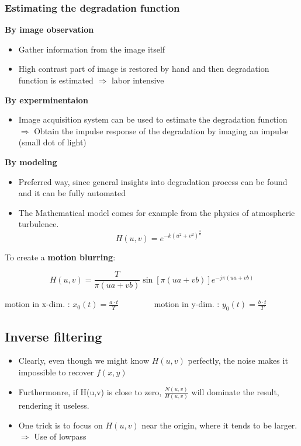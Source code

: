 \subsubsection{Estimating the degradation function }
\textbf{By image observation}
	\begin{itemize}
		\item Gather information from the image itself
		\item High contrast part of image is restored by hand and then degradation function is estimated $\Rightarrow$ labor intensive
	\end{itemize}
\textbf{By experminentaion}
	\begin{itemize}
		\item Image acquisition system can be used to estimate the degradation function\\
		$\Rightarrow$ Obtain the impulse response of the degradation by imaging an impulse (small dot of light)
	\end{itemize}

\textbf{By modeling}
	\begin{itemize}
		\item Preferred way, since general insights into degradation process can be found and it can be fully automated
		\item The Mathematical model comes for example from the physics of atmospheric turbulence.
			\begin{equation}
				H(u,v) = e^{-k(u^2+v^2)^{\frac{5}{6}}}
			\end{equation}
	\end{itemize}


To create a \textbf{motion blurring}:

	\begin{equation}
		H(u,v) = \frac{T}{\pi (ua + vb)}\sin[\pi (ua + vb)] e^{-j \pi(ua + vb)}
	\end{equation}

	\begin{center}
		motion in x-dim. : $x_0(t) = \frac{a \cdot t}{T} \qquad \qquad$
		motion in y-dim. : $y_0(t) = \frac{b \cdot t}{T}$
	\end{center}

\subsection{Inverse filtering }

\begin{itemize}
	\item Clearly, even though we might know $H(u,v)$ perfectly, the noise makes it impossible to recover $f(x,y)$
	\item Furthermonre, if H(u,v) is close to zero, $\frac{N(u,v)}{H(u,v)}$ will dominate the result, rendering it useless.
	\item One trick is to focus on $H(u,v)$ near the origin, where it tends to be larger. $\Rightarrow$ Use of lowpass
\end{itemize}


